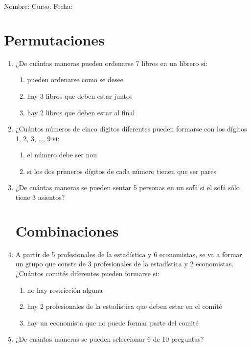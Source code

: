 \documentclass[letterpaper,fleqn]{article}
\newcommand{\LineaNombre}{%
\par
\vspace{\baselineskip}
Nombre:\hrulefill \; Curso: \underline{\hspace*{48pt}} \; Fecha: \underline{\hspace*{2.5cm}} \relax
\par}
\begin{document}
\LineaNombre
\section*{Permutaciones}
\begin{enumerate}
 \item ¿De cuántas maneras pueden ordenarse 7 libros en un librero si:
 \begin{enumerate}
 \item pueden ordenarse como se desee\noanswer
 \item hay 3 libros que deben estar juntos \noanswer
 \item hay 2 libros que deben estar al final \noanswer
\end{enumerate}   
\item ¿Cuántos números de cinco dígitos diferentes pueden formarse con los dígitos 1, 2, 3, \ldots , 9 si: 
\begin{enumerate}
\item el número debe ser non\noanswer
\newpage
\item si los dos primeros dígitos de cada número tienen que ser pares\noanswer
\end{enumerate} 
\item ¿De cuántas maneras se pueden sentar 5 personas en un sofá si el sofá sólo tiene 3 asientos?\noanswer
\section*{Combinaciones}
\item A partir de 5 profesionales de la estadística y 6 economistas, se va a formar un grupo que conste de 3 profesionales de la
estadística y 2 economistas. ¿Cuántos comités diferentes pueden formarse si: 
\begin{enumerate}
\item no hay restricción alguna\noanswer
\item hay 2 profesionales de la estadística que deben estar en el comité\noanswer
\item hay un economista que no puede formar parte del comité\noanswer
\end{enumerate}
\item ¿De cuántas maneras se pueden seleccionar 6 de 10 preguntas?\noanswer
 \end{enumerate}
\end{document}
